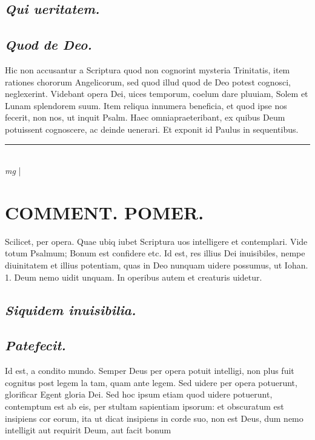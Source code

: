 \documentclass{article}
\begin{document}
\begin{pages}
\subsection*{\textit{Qui ueritatem. }}
{}
\subsection*{\textit{Quod de Deo. }}\pstart Hic non accusantur a Scriptura quod non cognorint mysteria Trinitatis, item rationes chororum Angelicorum, sed quod illud quod de Deo potest cognosci, neglexerint. Videbant opera Dei, uices temporum, coelum dare pluuiam, Solem et Lunam splendorem suum. Item reliqua innumera beneficia, et quod ipse nos fecerit, non nos, ut inquit Psalm. Haec omniapraeteribant, ex quibus Deum potuissent cognoscere, ac deinde uenerari. Et exponit id Paulus in sequentibus.   \pend
\vspace{0.5cm}\noindent
\vspace{0.2cm}\rule{1cm}{0.2pt}\\ 
\hspace{0.2cm}\textit{mg}
\footnotesize 
\normalsize| 
\section*{COMMENT. POMER.  }\pstart Scilicet, per opera. Quae ubiq iubet Scriptura uos intelligere et contemplari. Vide totum Psalmum; Bonum est confidere etc.  \pend\pstart Id est, res illius Dei inuisibiles, nempe diuinitatem et illius potentiam, quas in Deo nunquam uidere possumus, ut Iohan. 1. Deum nemo uidit unquam. In operibus autem et creaturis uidetur.   \pend
{}
{}
\subsection*{\textit{Siquidem inuisibilia. }}
{}
\subsection*{\textit{Patefecit. }}\pstart Id est, a condito mundo. Semper Deus per opera potuit intelligi, non plus fuit cognitus post legem la tam, quam ante legem. Sed uidere per opera potuerunt, glorificar Egent gloria Dei. Sed hoc ipsum etiam quod uidere potuerunt, contemptum est ab eis, per stultam sapientiam ipsorum: et obscuratum est insipiens cor eorum, ita ut dicat insipiens in corde suo, non est Deus, dum nemo intelligit aut requirit Deum, aut facit bonum\pend
{}
{}

\end{pages}
\end{document}

